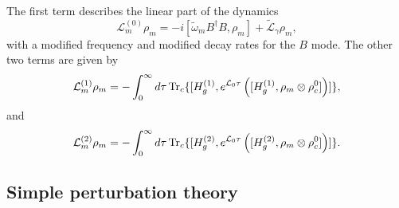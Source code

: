 The first term describes the linear part of the dynamics  
\begin{equation}
\mathcal{L}^{(0)}_m \rho_m=  -i[ \tilde \omega_m B^\dag B,\rho_m] + 
\tilde{\mathcal{L}}_\gamma \rho_m,
\end{equation} 
with a modified frequency and modified decay rates for the $B$ mode. The other
two terms are given by
\begin{equation}\label{eq:SM_Lm1}
\mathcal{L}^{(1)}_m \rho_m = - \int_{0}^{\infty}  d\tau\, {\rm Tr}_c\{
[H_{g}^{(1)} , e^{\mathcal{L}_{0}\tau}\left([H_{g}^{(1)},\rho_m \otimes 
\rho_c^0] \right) ]\},
\end{equation}
and
\begin{equation}\label{eq:SM_Lm2}
\mathcal{L}^{(2)}_m \rho_m = - \int_{0}^{\infty}  d\tau\, {\rm Tr}_c\{
[H_{g}^{(2)} , e^{\mathcal{L}_{0}\tau}\left([H_{g}^{(2)},\rho_m \otimes 
\rho_c^0] \right) ]\}.
\end{equation}
 

\subsection{Simple perturbation theory}

